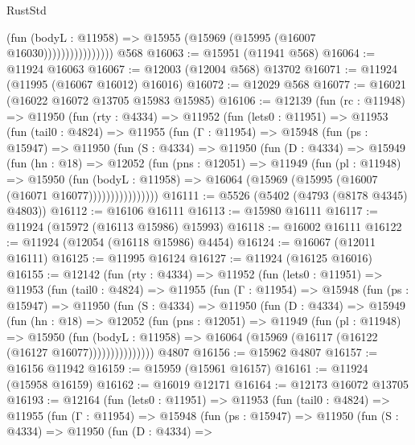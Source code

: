\begin{lexlean}{RustStd}
\begin{coremodule}
{\begin{coremodule}
{{{{{{{{{{{{{{{{{{{{{{{{{{{{{{{{{{{{{{{{{{{{{{{{{{{{{{{{{{{{{{{{{{{{{{{{{{{{{{{{                            (fun (bodyL : @11958) =>
                            @15955 (@15969 (@15995 (@16007 @16030))))))))))))))))
    @568
@16063 := @15951 (@11941 @568)
@16064 := @11924 @16063
@16067 := @12003 (@12004 @568) @13702
@16071 := @11924 (@11995 (@16067 @16012) @16016)
@16072 := @12029 @568
@16077 := @16021 (@16022 @16072 @13705 @15983 @15985)
@16106 := @12139
    (fun (rc : @11948) =>
    @11950
      (fun (rty : @4334) =>
      @11952
        (fun (lets0 : @11951) =>
        @11953
          (fun (tail0 : @4824) =>
          @11955
            (fun (Γ : @11954) =>
            @15948
              (fun (ps : @15947) =>
              @11950
                (fun (S : @4334) =>
                @11950
                  (fun (D : @4334) =>
                  @15949
                    (fun (hn : @18) =>
                    @12052
                      (fun (pns : @12051) =>
                      @11949
                        (fun (pl : @11948) =>
                        @15950
                          (fun (bodyL : @11958) =>
                          @16064 (@15969 (@15995 (@16007 (@16071 @16077))))))))))))))))
@16111 := @5526 (@5402 (@4793 (@8178 @4345) @4803))
@16112 := @16106 @16111
@16113 := @15980 @16111
@16117 := @11924 (@15972 (@16113 @15986) @15993)
@16118 := @16002 @16111
@16122 := @11924 (@12054 (@16118 @15986) @4454)
@16124 := @16067 (@12011 @16111)
@16125 := @11995 @16124
@16127 := @11924 (@16125 @16016)
@16155 := @12142
    (fun (rty : @4334) =>
    @11952
      (fun (lets0 : @11951) =>
      @11953
        (fun (tail0 : @4824) =>
        @11955
          (fun (Γ : @11954) =>
          @15948
            (fun (ps : @15947) =>
            @11950
              (fun (S : @4334) =>
              @11950
                (fun (D : @4334) =>
                @15949
                  (fun (hn : @18) =>
                  @12052
                    (fun (pns : @12051) =>
                    @11949
                      (fun (pl : @11948) =>
                      @15950
                        (fun (bodyL : @11958) =>
                        @16064 (@15969 (@16117 (@16122 (@16127 @16077)))))))))))))))
    @4807
@16156 := @15962 @4807
@16157 := @16156 @11942
@16159 := @15959 (@15961 @16157)
@16161 := @11924 (@15958 @16159)
@16162 := @16019 @12171
@16164 := @12173 @16072 @13705
@16193 := @12164
    (fun (lets0 : @11951) =>
    @11953
      (fun (tail0 : @4824) =>
      @11955
        (fun (Γ : @11954) =>
        @15948
          (fun (ps : @15947) =>
          @11950
            (fun (S : @4334) =>
            @11950
              (fun (D : @4334) =>
}}}}}}}}}}}}}}}}}}}}}}}}}}}}}}}}}}}}}}}}}}}}}}}}}}}}}}}}}}}}}}}}}}}}}}}}}}}}}}}}
\end{coremodule}}
\end{coremodule}
\end{lexlean}
